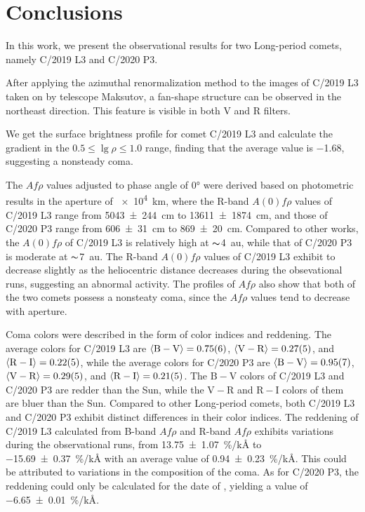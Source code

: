 \section{Conclusions} \label{sec:con}
In this work, we present the observational results for two Long-period comets, namely C/2019 L3 and C/2020 P3. 

After applying the azimuthal renormalization method to the images of C/2019 L3 taken on  by telescope Maksutov, a fan-shape structure can be observed in the northeast direction. This feature is visible in both V and R filters. 

We get the surface brightness profile for comet C/2019 L3 and calculate the gradient in the $0.5 \leqslant \lg{\rho} \leqslant 1.0$ range, finding that the average value is \num{-1.68}, suggesting a nonsteady coma. 

The $Af\rho$ values adjusted to phase angle of \ang{0} were derived based on photometric results in the aperture of \SI{e4}{\km}, where the R-band $A(0)f\rho$ values of C/2019 L3 range from {\qty{5043 +- 244}{\cm}} to {\qty{13611 +- 1874}{\cm}}, and those of C/2020 P3 range from {\qty{606 +- 31}{\cm}} to {\qty{869 +- 20}{\cm}}.
Compared to other works, the $A(0)f\rho$ of C/2019 L3 is relatively high at $\thicksim${\qty{4}{\astronomicalunit}}, while that of C/2020 P3 is moderate at $\thicksim${\SI{7}{\astronomicalunit}}. The R-band $A(0)f\rho$ values of C/2019 L3 exhibit to decrease slightly as the heliocentric distance decreases during the obsevational runs, suggesting an abnormal activity. The profiles of $Af\rho$ also show that both of the two comets possess a nonsteaty coma, since the $Af\rho$ values tend to decrease with aperture. 

Coma colors were described in the form of color indices and reddening. 
The average colors for C/2019 L3 are  
$\langle \mathrm{B} - \mathrm{V} \rangle = \num{0.75 +- 0.06}$, 
$\langle \mathrm{V} - \mathrm{R} \rangle = \num{0.27 +- 0.05}$, and 
$\langle \mathrm{R} - \mathrm{I} \rangle = \num{0.22 +- 0.05}$,  
while the average colors for C/2020 P3 are 
$\langle \mathrm{B} - \mathrm{V} \rangle = \num{0.95 +- 0.07}$, 
$\langle \mathrm{V} - \mathrm{R} \rangle = \num{0.29 +- 0.05}$, and 
$\langle \mathrm{R} - \mathrm{I} \rangle = \num{0.21 +- 0.05}$. 
The $\mathrm{B} - \mathrm{V}$ colors of C/2019 L3 and C/2020 P3 are redder than the Sun, while the $\mathrm{V} - \mathrm{R}$ and $\mathrm{R} - \mathrm{I}$ colors of them are bluer than the Sun. Compared to other Long-period comets, both C/2019 L3 and C/2020 P3 exhibit distinct differences in their color indices. The reddening of C/2019 L3 calculated from B-band $Af\rho$ and R-band $Af\rho$ exhibits variations during the observational runs, from {\qty{13.75 +- 1.07}{\percent/\kilo\angstrom}} to {\qty{-15.69 +- 0.37}{\percent/\kilo\angstrom}} with an average value of {\qty{0.94 +- 0.23}{\percent/\kilo\angstrom}}. This could be attributed to  variations in the composition of the coma. As for C/2020 P3, the reddening could only be calculated for the date of , yielding a value of {\qty{-6.65 +- 0.01}{\percent/\kilo\angstrom}}. 


